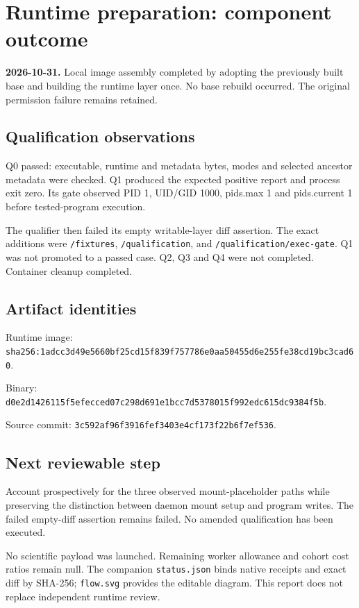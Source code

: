 \documentclass[11pt]{article}
\begin{document}
\section*{Runtime preparation: component outcome}
\textbf{2026-10-31.} Local image assembly completed by adopting the previously built base and building the runtime layer once. No base rebuild occurred. The original permission failure remains retained.
\subsection*{Qualification observations}
Q0 passed: executable, runtime and metadata bytes, modes and selected ancestor metadata were checked. Q1 produced the expected positive report and process exit zero. Its gate observed PID 1, UID/GID 1000, pids.max 1 and pids.current 1 before tested-program execution.

The qualifier then failed its empty writable-layer diff assertion. The exact additions were \texttt{/fixtures}, \texttt{/qualification}, and \texttt{/qualification/exec-gate}. Q1 was not promoted to a passed case. Q2, Q3 and Q4 were not completed. Container cleanup completed.
\subsection*{Artifact identities}
Runtime image: \texttt{sha256:1adcc3d49e5660bf25cd15f839f757786e0aa50455d6e255fe38cd19bc3cad60}.

Binary: \texttt{d0e2d1426115f5efecced07c298d691e1bcc7d5378015f992edc615dc9384f5b}.

Source commit: \texttt{3c592af96f3916fef3403e4cf173f22b6f7ef536}.
\subsection*{Next reviewable step}
Account prospectively for the three observed mount-placeholder paths while preserving the distinction between daemon mount setup and program writes. The failed empty-diff assertion remains failed. No amended qualification has been executed.

No scientific payload was launched. Remaining worker allowance and cohort cost ratios remain null. The companion \texttt{status.json} binds native receipts and exact diff by SHA-256; \texttt{flow.svg} provides the editable diagram. This report does not replace independent runtime review.
\end{document}
